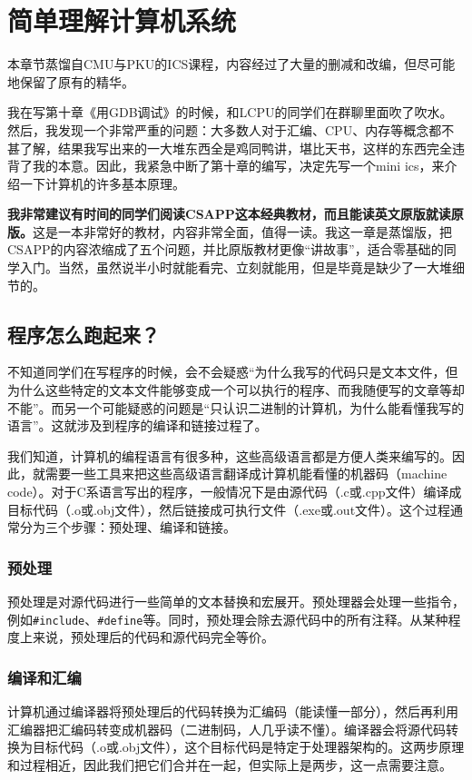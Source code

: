 \chapter{简单理解计算机系统}

\begin{flushright}
本章节蒸馏自CMU与PKU的ICS课程，内容经过了大量的删减和改编，但尽可能地保留了原有的精华。
\end{flushright}

我在写第十章《用GDB调试》的时候，和LCPU的同学们在群聊里面吹了吹水。然后，我发现一个非常严重的问题：大多数人对于汇编、CPU、内存等概念都不甚了解，结果我写出来的一大堆东西全是鸡同鸭讲，堪比天书，这样的东西完全违背了我的本意。因此，我紧急中断了第十章的编写，决定先写一个mini ics，来介绍一下计算机的许多基本原理。

\textbf{我非常建议有时间的同学们阅读CSAPP这本经典教材，而且能读英文原版就读原版。}这是一本非常好的教材，内容非常全面，值得一读。我这一章是蒸馏版，把CSAPP的内容浓缩成了五个问题，并比原版教材更像“讲故事”，适合零基础的同学入门。当然，虽然说半小时就能看完、立刻就能用，但是毕竟是缺少了一大堆细节的。

\section{程序怎么跑起来？}

不知道同学们在写程序的时候，会不会疑惑“为什么我写的代码只是文本文件，但为什么这些特定的文本文件能够变成一个可以执行的程序、而我随便写的文章等却不能”。而另一个可能疑惑的问题是“只认识二进制的计算机，为什么能看懂我写的语言”。这就涉及到程序的编译和链接过程了。

我们知道，计算机的编程语言有很多种，这些高级语言都是方便人类来编写的。因此，就需要一些工具来把这些高级语言翻译成计算机能看懂的机器码（machine code）。对于C系语言写出的程序，一般情况下是由源代码（.c或.cpp文件）编译成目标代码（.o或.obj文件），然后链接成可执行文件（.exe或.out文件）。这个过程通常分为三个步骤：预处理、编译和链接。

\subsection{预处理}
预处理是对源代码进行一些简单的文本替换和宏展开。预处理器会处理一些指令，例如\texttt{\#include}、\texttt{\#define}等。同时，预处理会除去源代码中的所有注释。从某种程度上来说，预处理后的代码和源代码完全等价。

\subsection{编译和汇编}
计算机通过编译器将预处理后的代码转换为汇编码（能读懂一部分），然后再利用汇编器把汇编码转变成机器码（二进制码，人几乎读不懂）。编译器会将源代码转换为目标代码（.o或.obj文件），这个目标代码是特定于处理器架构的。这两步原理和过程相近，因此我们把它们合并在一起，但实际上是两步，这一点需要注意。

